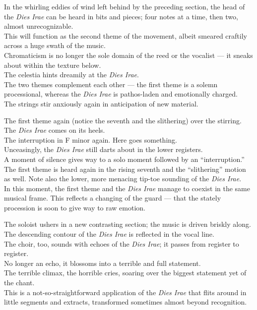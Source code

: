 \documentclass{beamer}
\begin{document}
\begin{frame}
  In the whirling eddies of wind left behind by the preceding section, the head of the \textit{Dies Irae} can be heard in bits and pieces; \pause four notes at a time, \pause then two, almost unrecognizable. 
  \pause \\
  This will function as the second theme of the movement, albeit smeared craftily across a huge swath of the music. 
  \pause \\ 
  Chromaticism is no longer the sole domain of the reed or the vocalist --- it sneaks about within the texture below. 
  \pause \\ 
  The celestia hints dreamily at the \textit{Dies Irae}. 
  \pause \\ 
  The two themes complement each other --- the first theme is a solemn processional, whereas the \textit{Dies Irae} is pathos-laden and emotionally charged. 
  \pause \\ 
  The strings stir anxiously again in anticipation of new material. 
\end{frame} 

\begin{frame} 
  The first theme again (notice the seventh and the slithering) over the stirring. \pause The \textit{Dies Irae} comes on its heels. 
  \pause \\ 
  The interruption in F minor again. Here goes something. 
  \pause \\ 
  Unceasingly, the \textit{Dies Irae} still darts about in the lower registers. 
  \pause \\ 
  A moment of silence gives way to a solo moment followed by an ``interruption.'' 
  \pause \\ 
  The first theme is heard again in the rising seventh and the ``slithering'' motion as well. Note also the lower, more menacing tip-toe sounding of the \textit{Dies Irae}. 
  \pause \\ 
  In this moment, the first theme and the \textit{Dies Irae} manage to coexist in the same musical frame. This reflects a changing of the guard --- that the stately procession is soon to give way to raw emotion. 
\end{frame} 

\begin{frame}
  The soloist ushers in a new contrasting section; the music is driven briskly along. 
  \pause \\ 
  The descending contour of the \textit{Dies Irae} is reflected in the vocal line. 
  \pause \\ 
  The choir, too, sounds with echoes of the \textit{Dies Irae}; it passes from register to register. 
  \pause \\
  No longer an echo, it blossoms into a terrible and full statement. 
  \pause \\ 
  The terrible climax, the horrible cries, soaring over the biggest statement yet of the chant. 
  \pause \\ 
  This is a not-so-straightforward application of the \textit{Dies Irae} that flits around in little segments and extracts, transformed sometimes almost beyond recognition. 
\end{frame} 
\end{document}
